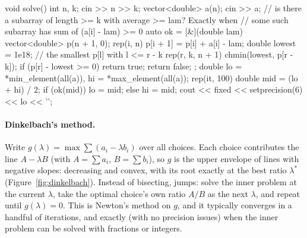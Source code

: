 \begin{code}
void solve() {
    int n, k;
    cin >> n >> k;
    vector<double> a(n);
    cin >> a;
    // is there a subarray of length >= k with average >= lam? Exactly when
    // some such subarray has sum of (a[i] - lam) >= 0
    auto ok = [&](double lam) {
        vector<double> p(n + 1, 0);
        rep(i, n) p[i + 1] = p[i] + a[i] - lam;
        double lowest = 1e18;  // the smallest p[l] with l <= r - k
        rep(r, k, n + 1) {
            chmin(lowest, p[r - k]);
            if (p[r] - lowest >= 0) return true;
        }
        return false;
    };
    double lo = *min_element(all(a)), hi = *max_element(all(a));
    rep(it, 100) {
        double mid = (lo + hi) / 2;
        if (ok(mid)) lo = mid;
        else hi = mid;
    }
    cout << fixed << setprecision(6) << lo << '\n';
}
\end{code}

\paragraph{Dinkelbach's method.} Write $g(\lambda) = \max \sum (a_i - \lambda b_i)$ over all choices. Each choice contributes
the line $A - \lambda B$ (with $A = \sum a_i$, $B = \sum b_i$), so $g$ is the upper envelope of lines with negative slopes:
decreasing and convex, with its root exactly at the best ratio $\lambda^\ast$ (Figure~\ref{fig:dinkelbach}). Instead of
bisecting,  jumps: solve the inner problem at the current $\lambda$, take the optimal choice's own
ratio $A/B$ as the next $\lambda$, and repeat until $g(\lambda) = 0$. This is Newton's method on $g$, and it typically
converges in a handful of iterations, and exactly (with no precision issues) when the inner problem can be solved with
fractions or integers.

